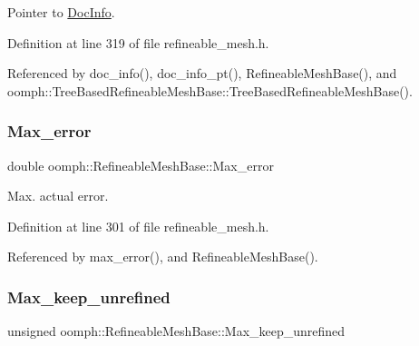 Pointer to \hyperlink{classoomph_1_1DocInfo}{Doc\+Info}. 



Definition at line 319 of file refineable\+\_\+mesh.\+h.



Referenced by doc\+\_\+info(), doc\+\_\+info\+\_\+pt(), Refineable\+Mesh\+Base(), and oomph\+::\+Tree\+Based\+Refineable\+Mesh\+Base\+::\+Tree\+Based\+Refineable\+Mesh\+Base().

\mbox{\label{classoomph_1_1RefineableMeshBase_aa179661bfb11a786cc84aba4032c97d8}} 
\subsubsection{\texorpdfstring{Max\+\_\+error}{Max\_error}}
{\footnotesize\ttfamily double oomph\+::\+Refineable\+Mesh\+Base\+::\+Max\+\_\+error\hspace{0.3cm}{\ttfamily [protected]}}



Max. actual error. 



Definition at line 301 of file refineable\+\_\+mesh.\+h.



Referenced by max\+\_\+error(), and Refineable\+Mesh\+Base().

\mbox{\label{classoomph_1_1RefineableMeshBase_a55c7480baae4082f4da4cbb48c40c623}} 
\subsubsection{\texorpdfstring{Max\+\_\+keep\+\_\+unrefined}{Max\_keep\_unrefined}}
{\footnotesize\ttfamily unsigned oomph\+::\+Refineable\+Mesh\+Base\+::\+Max\+\_\+keep\+\_\+unrefined\hspace{0.3cm}{\ttfamily [protected]}}



